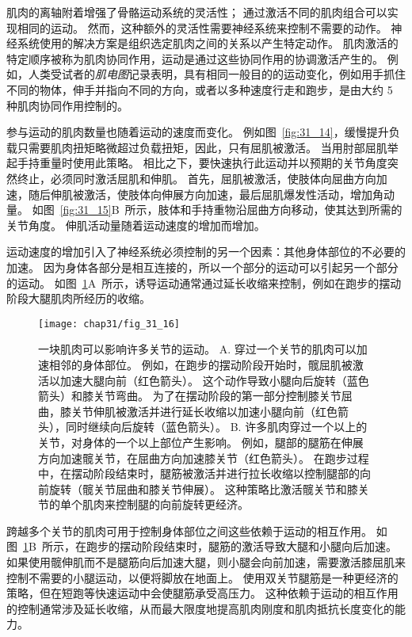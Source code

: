 肌肉的离轴附着增强了骨骼运动系统的灵活性；
通过激活不同的肌肉组合可以实现相同的运动。
然而，这种额外的灵活性需要神经系统来控制不需要的动作。
神经系统使用的解决方案是组织选定肌肉之间的关系以产生特定动作。
肌肉激活的特定顺序被称为肌肉协同作用，运动是通过这些协同作用的协调激活产生的。
例如，人类受试者的\textit{肌电图}记录表明，具有相同一般目的的运动变化，例如用手抓住不同的物体，伸手并指向不同的方向，或者以多种速度行走和跑步，是由大约 5 种肌肉协同作用控制的。


参与运动的肌肉数量也随着运动的速度而变化。
例如图~\ref{fig:31_14}，缓慢提升负载只需要肌肉扭矩略微超过负载扭矩，因此，只有屈肌被激活。
当用肘部屈肌举起手持重量时使用此策略。
相比之下，要快速执行此运动并以预期的关节角度突然终止，必须同时激活屈肌和伸肌。
首先，屈肌被激活，使肢体向屈曲方向加速，随后伸肌被激活，使肢体向伸展方向加速，最后屈肌爆发性活动，增加角动量。
如图~\ref{fig:31_15}B~所示，肢体和手持重物沿屈曲方向移动，使其达到所需的关节角度。 
伸肌活动量随着运动速度的增加而增加。


运动速度的增加引入了神经系统必须控制的另一个因素：其他身体部位的不必要的加速。
因为身体各部分是相互连接的，所以一个部分的运动可以引起另一个部分的运动。
如图~\ref{fig:31_16}A~所示，诱导运动通常通过延长收缩来控制，例如在跑步的摆动阶段大腿肌肉所经历的收缩。


\begin{figure}[htbp]
	\centering
	\texttt{[image: chap31/fig\_31\_16]}
	\caption{一块肌肉可以影响许多关节的运动。
	A. 穿过一个关节的肌肉可以加速相邻的身体部位。
	例如，在跑步的摆动阶段开始时，髋屈肌被激活以加速大腿向前（红色箭头）。
	这个动作导致小腿向后旋转（蓝色箭头）和膝关节弯曲。
	为了在摆动阶段的第一部分控制膝关节屈曲，膝关节伸肌被激活并进行延长收缩以加速小腿向前（红色箭头），同时继续向后旋转（蓝色箭头）。
	B. 许多肌肉穿过一个以上的关节，对身体的一个以上部位产生影响。
	例如，腿部的腿筋在伸展方向加速髋关节，在屈曲方向加速膝关节（红色箭头）。
	在跑步过程中，在摆动阶段结束时，腿筋被激活并进行拉长收缩以控制腿部的向前旋转（髋关节屈曲和膝关节伸展）。
	这种策略比激活髋关节和膝关节的单个肌肉来控制腿的向前旋转更经济。}
	\label{fig:31_16}
\end{figure}


跨越多个关节的肌肉可用于控制身体部位之间这些依赖于运动的相互作用。
如图~\ref{fig:31_16}B~所示，在跑步的摆动阶段结束时，腿筋的激活导致大腿和小腿向后加速。
如果使用髋伸肌而不是腿筋向后加速大腿，则小腿会向前加速，需要激活膝屈肌来控制不需要的小腿运动，以便将脚放在地面上。
使用双关节腿筋是一种更经济的策略，但在短跑等快速运动中会使腿筋承受高压力。
这种依赖于运动的相互作用的控制通常涉及延长收缩，从而最大限度地提高肌肉刚度和肌肉抵抗长度变化的能力。


